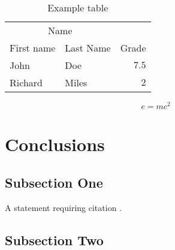 \documentclass[oneside,twocolumn]{article}
\begin{document}
\begin{table}
  \caption{Example table}
  \centering
  \begin{tabular}{llr}
    \toprule
    \multicolumn{2}{c}{Name} \\
    \cmidrule(r){1-2}
    First name & Last Name & Grade \\
    \midrule
    John & Doe & $7.5$ \\
    Richard & Miles & $2$ \\
    \bottomrule
  \end{tabular}
\end{table}

\blindtext %

\begin{equation}
  \label{eq:emc}
  e = mc^2
\end{equation}

\blindtext %


\section{Conclusions}

\subsection{Subsection One}

A statement requiring citation \cite{Figueredo:2009dg}.
\blindtext %

\subsection{Subsection Two}

\blindtext %

\end{document}
